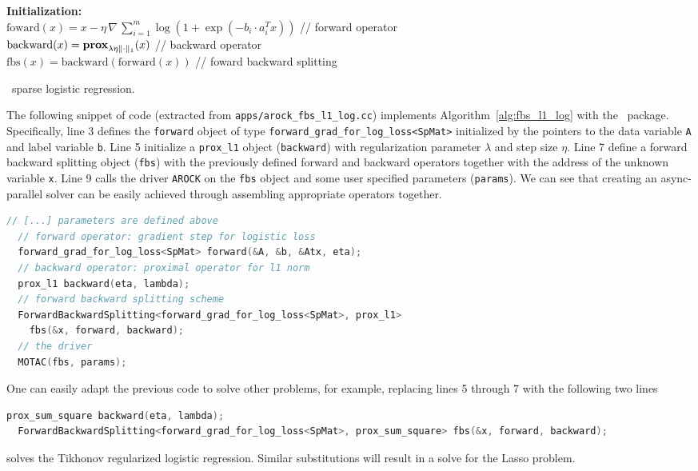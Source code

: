 \begin{algorithm}[H]\label{alg:fbs_l1_log}
  \textbf{Initialization:} \\
  \quad $\text{foward}(x) = x - \eta \, \nabla \,\sum_{i = 1}^m \log (1 + \exp(-b_i \cdot a_i^T x))$ // forward operator \\
  \quad $\text{backward}(x) = \mathbf{prox}_{\lambda \eta \|\cdot\|_1} (x)$ \hspace{32mm} // backward operator\\
  \quad $\text{fbs}(x) = \text{backward}(\text{forward}(x))$  \hspace{29mm} // foward backward splitting \\
  \caption{\pkg~sparse logistic regression.}
\end{algorithm}
The following snippet of code (extracted from 
\texttt{apps/arock\_fbs\_l1\_log.cc}) implements Algorithm~\ref{alg:fbs_l1_log} with the \pkg~package. 
Specifically, line 3 defines the \texttt{forward} object of type \texttt{forward\_grad\_for\_log\_loss<SpMat>} 
initialized by the pointers to the data variable \texttt{A} and label variable \texttt{b}. Line 5  initialize a 
\texttt{prox\_l1} object (\texttt{backward}) with regularization parameter $\lambda$ and step size $\eta$. 
Line 7 define a forward backward splitting object (\texttt{fbs}) with the previously defined forward and 
backward operators together with the address of the unknown variable \texttt{x}. Line 9 calls the driver 
\texttt{AROCK} on the \texttt{fbs} object and some user specified parameters (\texttt{params}). We can see
that creating an async-parallel solver can be easily achieved through assembling appropriate operators together.  
\begin{lstlisting}[language=C++]
  // [...] parameters are defined above
  // forward operator: gradient step for logistic loss
  forward_grad_for_log_loss<SpMat> forward(&A, &b, &Atx, eta);
  // backward operator: proximal operator for l1 norm 
  prox_l1 backward(eta, lambda);
  // forward backward splitting scheme
  ForwardBackwardSplitting<forward_grad_for_log_loss<SpMat>, prox_l1>
    fbs(&x, forward, backward);  
  // the driver
  MOTAC(fbs, params);  
\end{lstlisting}
One can easily adapt the previous code to solve other problems, for example, replacing lines 5 through 7 with
the following two lines
\begin{lstlisting}[language=C++]
  prox_sum_square backward(eta, lambda);
  ForwardBackwardSplitting<forward_grad_for_log_loss<SpMat>, prox_sum_square> fbs(&x, forward, backward);    
\end{lstlisting}
solves the Tikhonov regularized logistic regression. Similar substitutions will result in a solve for the Lasso problem.
